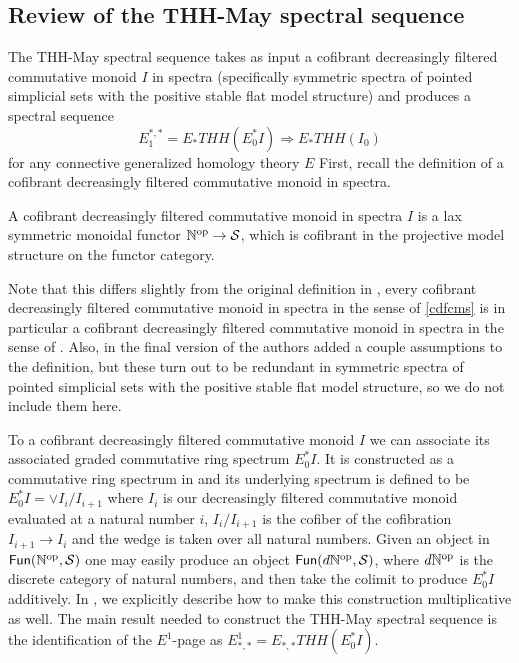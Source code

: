 \subsection{Review of the THH-May spectral sequence}
The THH-May spectral sequence takes as input a cofibrant decreasingly filtered commutative monoid $I$ in spectra (specifically symmetric spectra of pointed simplicial sets with the positive stable flat model structure) and produces a spectral sequence 
\[ E_1^{*,*}=E_*THH(E_0^*I) \Rightarrow E_*THH(I_0)\]
for any connective generalized homology theory $E$
First, recall the definition of a cofibrant decreasingly filtered commutative monoid in spectra. 
\begin{defn} \label{cdfcms}
A cofibrant decreasingly filtered commutative monoid in spectra $I$ is a lax symmetric monoidal functor $\mathbb{N}^{\mathrm{op}}\rightarrow \mathcal{S}$, which is cofibrant in the projective model structure on the functor category.
\end{defn}
\begin{rmk}
Note that this differs slightly from the original definition in \cite{THH-May}, every cofibrant decreasingly filtered commutative monoid in spectra in the sense of \ref{cdfcms} is in particular a cofibrant decreasingly filtered commutative monoid in spectra in the sense of \cite[Def. 3.1.2]{THH-May}. Also, in the final version of \cite{THH-May} the authors added a couple assumptions to the definition, but these turn out to be redundant in symmetric spectra of pointed simplicial sets with the positive stable flat model structure, so we do not include them here. 
\end{rmk}
To a cofibrant decreasingly filtered commutative monoid $I$ we can associate its associated graded commutative ring spectrum $E_0^*I$. It is constructed as a commutative ring spectrum in \cite[Def. 3.16]{THH-May} and its underlying spectrum is defined to be $E_0^*I=\vee I_i/I_{i+1}$ where $I_i$ is our decreasingly filtered commutative monoid evaluated at a natural number $i$, $I_i/I_{i+1}$ is the cofiber of the cofibration $I_{i+1}\rightarrow I_i$ and the wedge is taken over all natural numbers. Given an object in $\mathsf{Fun}(\mathbb{N}^{\mathrm{op}},\mathcal{S})$ one may easily produce an object $\mathsf{Fun}(d\mathbb{N}^{\mathrm{op}},\mathcal{S})$, where $d\mathbb{N}^{\mathrm{op}}$ is the discrete category of natural numbers, and then take the colimit to produce $E_0^*I$ additively. In \cite[Def. 3.1.2]{THH-May}, we explicitly describe how to make this construction multiplicative as well. The main result needed to construct the THH-May spectral sequence is the identification of the $E^1$-page as $E^1_{*,*}=E_{*,*}THH(E_0^*I)$. 

